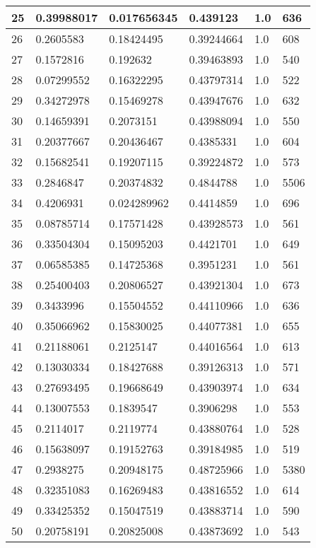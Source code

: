 \begin{longtable}{|l|l|l|l|l|l|}
25 & 0.39988017 & 0.017656345 & 0.439123 & 1.0 & 636 \\ \hline 
26 & 0.2605583 & 0.18424495 & 0.39244664 & 1.0 & 608 \\ \hline 
27 & 0.1572816 & 0.192632 & 0.39463893 & 1.0 & 540 \\ \hline 
28 & 0.07299552 & 0.16322295 & 0.43797314 & 1.0 & 522 \\ \hline 
29 & 0.34272978 & 0.15469278 & 0.43947676 & 1.0 & 632 \\ \hline 
30 & 0.14659391 & 0.2073151 & 0.43988094 & 1.0 & 550 \\ \hline 
31 & 0.20377667 & 0.20436467 & 0.4385331 & 1.0 & 604 \\ \hline 
32 & 0.15682541 & 0.19207115 & 0.39224872 & 1.0 & 573 \\ \hline 
33 & 0.2846847 & 0.20374832 & 0.4844788 & 1.0 & 5506 \\ \hline 
34 & 0.4206931 & 0.024289962 & 0.4414859 & 1.0 & 696 \\ \hline 
35 & 0.08785714 & 0.17571428 & 0.43928573 & 1.0 & 561 \\ \hline 
36 & 0.33504304 & 0.15095203 & 0.4421701 & 1.0 & 649 \\ \hline 
37 & 0.06585385 & 0.14725368 & 0.3951231 & 1.0 & 561 \\ \hline 
38 & 0.25400403 & 0.20806527 & 0.43921304 & 1.0 & 673 \\ \hline 
39 & 0.3433996 & 0.15504552 & 0.44110966 & 1.0 & 636 \\ \hline 
40 & 0.35066962 & 0.15830025 & 0.44077381 & 1.0 & 655 \\ \hline 
41 & 0.21188061 & 0.2125147 & 0.44016564 & 1.0 & 613 \\ \hline 
42 & 0.13030334 & 0.18427688 & 0.39126313 & 1.0 & 571 \\ \hline 
43 & 0.27693495 & 0.19668649 & 0.43903974 & 1.0 & 634 \\ \hline 
44 & 0.13007553 & 0.1839547 & 0.3906298 & 1.0 & 553 \\ \hline 
45 & 0.2114017 & 0.2119774 & 0.43880764 & 1.0 & 528 \\ \hline 
46 & 0.15638097 & 0.19152763 & 0.39184985 & 1.0 & 519 \\ \hline 
47 & 0.2938275 & 0.20948175 & 0.48725966 & 1.0 & 5380 \\ \hline 
48 & 0.32351083 & 0.16269483 & 0.43816552 & 1.0 & 614 \\ \hline 
49 & 0.33425352 & 0.15047519 & 0.43883714 & 1.0 & 590 \\ \hline 
50 & 0.20758191 & 0.20825008 & 0.43873692 & 1.0 & 543 \\ \hline 
\end{longtable}